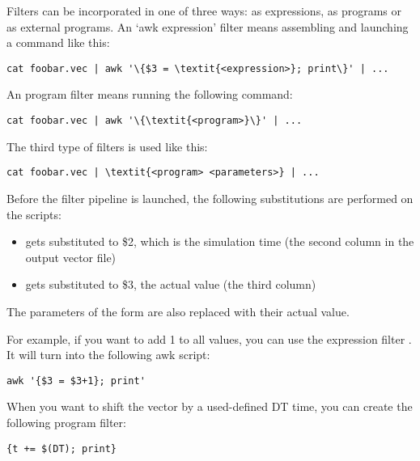 Filters can be incorporated in one of three ways: as 
expressions, as  programs or as external programs. An `awk
expression' filter means assembling and launching a command like this:

\begin{Verbatim}[commandchars=\\\{\}]
cat foobar.vec | awk '\{$3 = \textit{<expression>}; print\}' | ...
\end{Verbatim}

An  program filter means running the following command:

\begin{Verbatim}[commandchars=\\\{\}]
cat foobar.vec | awk '\{\textit{<program>}\}' | ...
\end{Verbatim}

The third type of filters is used like this:

\begin{Verbatim}[commandchars=\\\{\}]
cat foobar.vec | \textit{<program> <parameters>} | ...
\end{Verbatim}

Before the filter pipeline is launched, the following substitutions
are performed on the  scripts:

\begin{itemize}
  \item {} gets substituted to \$2, which is the simulation time
  (the second column in the output vector file)
  \item {} gets substituted to \$3, the actual value (the third column)
\end{itemize}

The parameters of the form  are also replaced with
their actual value.

For example, if you want to add 1 to all values, you can use the 
expression filter . It will turn into the following awk script:

\begin{verbatim}
awk '{$3 = $3+1}; print'
\end{verbatim}


When you want to shift the vector by a used-defined DT time,
you can create the following  program filter:

\begin{verbatim}
{t += $(DT); print}
\end{verbatim}

